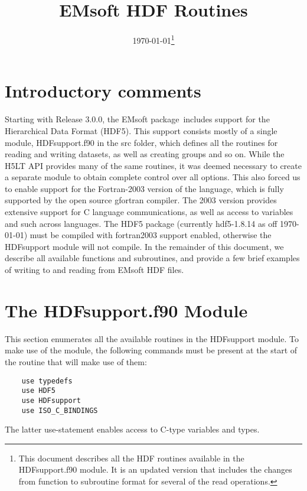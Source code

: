 \documentclass[DIV=calc, paper=letter, fontsize=11pt]{scrartcl}	 %
\title{EMsoft HDF Routines} %
\author{\vspace*{-0.7in}} %
\date{\today\protect\footnote{This document describes all the HDF routines available in the HDFsupport.f90 module.  It is an updated version that includes the changes from function to subroutine format for several of the read operations.}}
\newcommand{\ctp}{\textsf{EMsoft} package}
\begin{document}
\maketitle
\renewcommand{\contentsname}{Table of Contents}
{\small\tableofcontents}

\newpage
\section{Introductory comments}
Starting with Release 3.0.0, the \ctp\ includes support for the Hierarchical Data Format (HDF5).  This support consists
mostly of a single module, \textsf{HDFsupport.f90} in the \textsf{src} folder, which defines all the routines for reading
and writing datasets, as well as creating groups and so on.  While the H5LT API provides many of the same routines, it was
deemed necessary to create a separate module to obtain complete control over all options.  This also forced us to enable
support for the Fortran-2003 version of the language, which is fully supported by the open source \textsf{gfortran} compiler. The
2003 version provides extensive support for C language communications, as well as access to variables and such across 
languages.  The HDF5 package (currently hdf5-1.8.14 as off \today) must be compiled with fortran2003 support enabled,
otherwise the \textsf{HDFsupport} module will not compile.
In the remainder of this document, we describe all available functions and subroutines, and provide a few brief examples 
of writing to and reading from \textsf{EMsoft} HDF files.


\section{The HDFsupport.f90 Module}
This section enumerates all the available routines in the \textsf{HDFsupport} module.  To make use of the module, the following
commands must be present at the start of the routine that will make use of them:
\begin{verbatim}
	use typedefs
	use HDF5
	use HDFsupport
	use ISO_C_BINDINGS
\end{verbatim}
The latter use-statement enables access to C-type variables and types.
\end{document}
